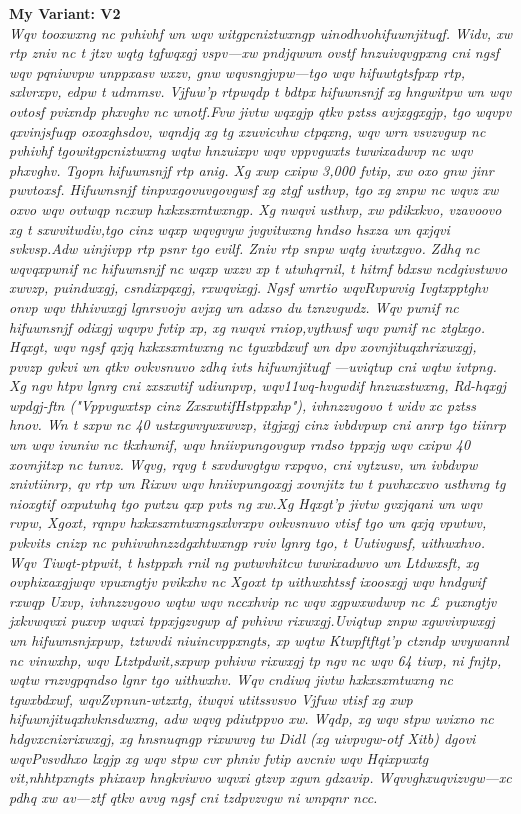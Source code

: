 \documentclass[12pt]{article}
\begin{document}
\textbf{My Variant: V2} \\
\textit{Wqv tooxwxng nc pvhivhf wn wqv witgpcniztwxngp uinodhvohifuwnjituqf. Widv, xw rtp zniv nc t
jtzv wqtg tgfwqxgj vspv—xw pndjqwwn ovstf hnzuivqvgpxng cni ngsf wqv pqniwvpw unppxasv
wxzv, gnw wqvsngjvpw—tgo wqv hifuwtgtsfpxp rtp, sxlvrxpv, edpw t udmmsv. Vjfuw'p rtpwqdp t
bdtpx hifuwnsnjf xg hngwitpw wn wqv ovtosf pvixndp phxvghv nc wnotf.Fvw jivtw wqxgjp qtkv
pztss avjxggxgjp, tgo wqvpv qxvinjsfuqp oxoxghsdov, wqndjq xg tg xzuvicvhw ctpqxng, wqv wrn
vsvzvgwp nc pvhivhf tgowitgpcniztwxng wqtw hnzuixpv wqv vppvgwxts twwixadwvp nc wqv
phxvghv. Tgopn hifuwnsnjf rtp anig. Xg xwp cxipw 3,000 fvtip, xw oxo gnw jinr pwvtoxsf.
Hifuwnsnjf tinpvxgovuvgovgwsf xg ztgf usthvp, tgo xg znpw nc wqvz xw oxvo wqv ovtwqp ncxwp
hxkxsxmtwxngp. Xg nwqvi usthvp, xw pdikxkvo, vzavoovo xg t sxwvitwdiv,tgo cinz wqxp wqvgvyw jvgvitwxng hndso hsxza wn qxjqvi svkvsp.Adw uinjivpp rtp psnr tgo evilf. Zniv rtp snpw wqtg
ivwtxgvo. Zdhq nc wqvqxpwnif nc hifuwnsnjf nc wqxp wxzv xp t utwhqrnil, t hitmf bdxsw
ncdgivstwvo xwvzp, puindwxgj, csndixpqxgj, rxwqvixgj. Ngsf wnrtio wqvRvpwvig Ivgtxpptghv
onvp wqv thhivwxgj lgnrsvojv avjxg wn adxso du tznzvgwdz. Wqv pwnif nc hifuwnsnjf odixgj
wqvpv fvtip xp, xg nwqvi rniop,vythwsf wqv pwnif nc ztglxgo. Hqxgt, wqv ngsf qxjq hxkxsxmtwxng
nc tgwxbdxwf wn dpv xovnjituqxhrixwxgj, pvvzp gvkvi wn qtkv ovkvsnuvo zdhq ivts hifuwnjituqf
—uviqtup cni wqtw ivtpng. Xg ngv htpv lgnrg cni zxsxwtif udiunpvp, wqv11wq-hvgwdif
hnzuxstwxng, Rd-hqxgj wpdgj-ftn ("Vppvgwxtsp cinz ZxsxwtifHstppxhp"), ivhnzzvgovo t widv xc
pztss hnov. Wn t sxpw nc 40 ustxgwvywxwvzp, itgjxgj cinz ivbdvpwp cni anrp tgo tiinrp wn wqv
ivuniw nc tkxhwnif, wqv hniivpungovgwp rndso tppxjg wqv cxipw 40 xovnjitzp nc tunvz. Wqvg,
rqvg t sxvdwvgtgw rxpqvo, cni vytzusv, wn ivbdvpw znivtiinrp, qv rtp wn Rixwv wqv hniivpungoxgj
xovnjitz tw t puvhxcxvo usthvng tg nioxgtif oxputwhq tgo pwtzu qxp pvts ng xw.Xg Hqxgt'p jivtw
gvxjqani wn wqv rvpw, Xgoxt, rqnpv hxkxsxmtwxngsxlvrxpv ovkvsnuvo vtisf tgo wn qxjq vpwtwv,
pvkvits cnizp nc pvhivwhnzzdgxhtwxngp rviv lgnrg tgo, t Uutivgwsf, uithwxhvo. Wqv Tiwqt-ptpwit,
t hstppxh rnil ng pwtwvhitcw twwixadwvo wn Ltdwxsft, xg ovphixaxgjwqv vpuxngtjv pvikxhv nc
Xgoxt tp uithwxhtssf ixoosxgj wqv hndgwif rxwqp Uxvp, ivhnzzvgovo wqtw wqv nccxhvip nc wqv
xgpwxwdwvp nc £ puxngtjv jxkvwqvxi puxvp wqvxi tppxjgzvgwp af pvhivw rixwxgj.Uviqtup znpw
xgwvivpwxgj wn hifuwnsnjxpwp, tztwvdi niuincvppxngts, xp wqtw Ktwpftftgt'p ctzndp wvywannl
nc vinwxhp, wqv Ltztpdwit,sxpwp pvhivw rixwxgj tp ngv nc wqv 64 tiwp, ni fnjtp, wqtw rnzvgpqndso
lgnr tgo uithwxhv. Wqv cndiwq jivtw hxkxsxmtwxng nc tgwxbdxwf, wqvZvpnun-wtzxtg, itwqvi
utitssvsvo Vjfuw vtisf xg xwp hifuwnjituqxhvknsdwxng, adw wqvg pdiutppvo xw. Wqdp, xg wqv
stpw uvixno nc hdgvxcnizrixwxgj, xg hnsnuqngp rixwwvg tw Didl (xg uivpvgw-otf Xitb) dgovi
wqvPvsvdhxo lxgjp xg wqv stpw cvr phniv fvtip avcniv wqv Hqixpwxtg vit,nhhtpxngts phixavp
hngkviwvo wqvxi gtzvp xgwn gdzavip. Wqvvghxuqvizvgw—xc pdhq xw av—ztf qtkv avvg ngsf cni
tzdpvzvgw ni wnpqnr ncc.}
\end{document}
